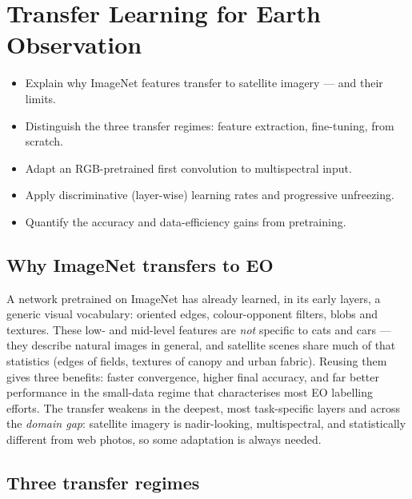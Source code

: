 \chapter{Transfer Learning for Earth Observation}
\label{ch:transfer}


\begin{objbox}
\begin{itemize}[leftmargin=1.2em,nosep]
  \item Explain why ImageNet features transfer to satellite imagery --- and their limits.
  \item Distinguish the three transfer regimes: feature extraction, fine-tuning, from scratch.
  \item Adapt an RGB-pretrained first convolution to multispectral input.
  \item Apply discriminative (layer-wise) learning rates and progressive unfreezing.
  \item Quantify the accuracy and data-efficiency gains from pretraining.
\end{itemize}
\end{objbox}

\section{Why ImageNet transfers to EO}

A network pretrained on ImageNet has already learned, in its early layers, a
generic visual vocabulary: oriented edges, colour-opponent filters, blobs and
textures. These low- and mid-level features are \emph{not} specific to cats and
cars --- they describe natural images in general, and satellite scenes share
much of that statistics (edges of fields, textures of canopy and urban fabric).
Reusing them gives three benefits: faster convergence, higher final accuracy,
and far better performance in the small-data regime that characterises most EO
labelling efforts. The transfer weakens in the deepest, most task-specific
layers and across the \emph{domain gap}: satellite imagery is nadir-looking,
multispectral, and statistically different from web photos, so some adaptation
is always needed.

\section{Three transfer regimes}

